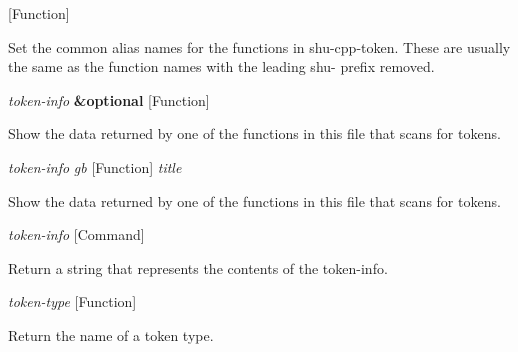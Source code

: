 \vspace{1em}
\noindent
{}
\usebox{\funcname}
 \hfill [Function]

\begin{doc-string}
Set the common alias names for the functions in shu-cpp-token.
These are usually the same as the function names with the leading
shu- prefix removed.
\end{doc-string}

\vspace{1em}
\noindent
{}
\usebox{\funcname}\emph{token-info} \textbf{\&optional}
 \hfill [Function]
\hspace*{\wd\funcname}

\begin{doc-string}
Show the data returned by one of the functions in this file that scans for tokens.
\end{doc-string}

\vspace{1em}
\noindent
{}
\usebox{\funcname}\emph{token-info} \emph{gb}
 \hfill [Function]
\hspace*{\wd\funcname}\emph{title}

\begin{doc-string}
Show the data returned by one of the functions in this file that scans for tokens.
\end{doc-string}

\vspace{1em}
\noindent
{}
\usebox{\funcname}\emph{token-info}
 \hfill [Command]

\begin{doc-string}
Return a string that represents the contents of the token-info.
\end{doc-string}

\vspace{1em}
\noindent
{}
\usebox{\funcname}\emph{token-type}
 \hfill [Function]

\begin{doc-string}
Return the name of a token type.
\end{doc-string}

